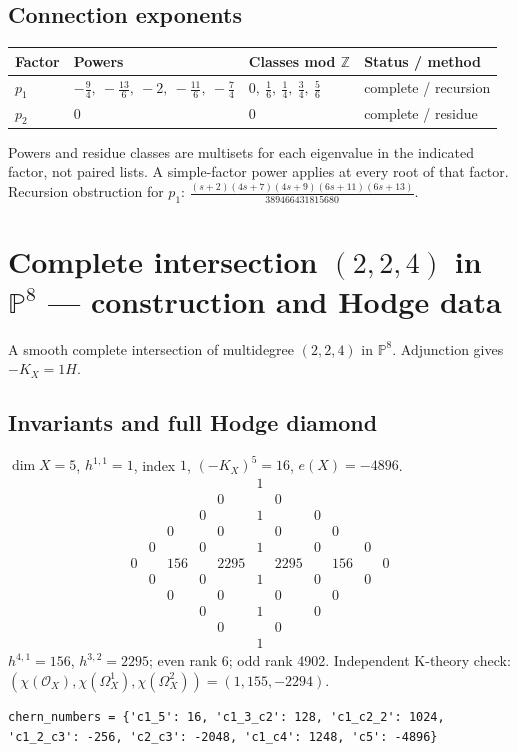 \documentclass[10pt,a4paper]{article}
\begin{document}
\subsection*{Connection exponents}
\begin{center}\begin{tabular}{llll}\toprule Factor & Powers & Classes mod $\mathbb Z$ & Status / method\\\midrule
$p_{1}$ & $- \frac{9}{4},\ - \frac{13}{6},\ -2,\ - \frac{11}{6},\ - \frac{7}{4}$ & $0,\ \frac{1}{6},\ \frac{1}{4},\ \frac{3}{4},\ \frac{5}{6}$ & complete / recursion\\
$p_{2}$ & $0$ & $0$ & complete / residue\\
\bottomrule\end{tabular}\end{center}
Powers and residue classes are multisets for each eigenvalue in the indicated factor, not paired lists. A simple-factor power applies at every root of that factor.
Recursion obstruction for $p_{1}$: $\frac{\left(s + 2\right) \left(4 s + 7\right) \left(4 s + 9\right) \left(6 s + 11\right) \left(6 s + 13\right)}{389466431815680}$.
\clearpage\section*{Complete intersection $(2,2,4)$ in $\mathbb P^{8}$ --- construction and Hodge data}\label{entry:PCI5-2-2-4}
A smooth complete intersection of multidegree $(2,2,4)$ in $\mathbb P^{8}$.
Adjunction gives $-K_X=1H$.
\subsection*{Invariants and full Hodge diamond}
$\dim X=5$, $h^{1,1}=1$, index $1$, $(-K_X)^5=16$, $e(X)=-4896$.
\[\begin{array}{ccccccccccc}&&&&&1&&&&&\\&&&&0&&0&&&&\\&&&0&&1&&0&&&\\&&0&&0&&0&&0&&\\&0&&0&&1&&0&&0&\\0&&156&&2295&&2295&&156&&0\\&0&&0&&1&&0&&0&\\&&0&&0&&0&&0&&\\&&&0&&1&&0&&&\\&&&&0&&0&&&&\\&&&&&1&&&&&\end{array}\]
$h^{4,1}=156$, $h^{3,2}=2295$; even rank 6; odd rank 4902.
Independent K-theory check: $(\chi(\mathcal O_X),\chi(\Omega_X^1),\chi(\Omega_X^2))=(1, 155, -2294)$.
\begin{lstlisting}
chern_numbers = {'c1_5': 16, 'c1_3_c2': 128, 'c1_c2_2': 1024, 'c1_2_c3': -256, 'c2_c3': -2048, 'c1_c4': 1248, 'c5': -4896}
\end{lstlisting}
\end{document}
